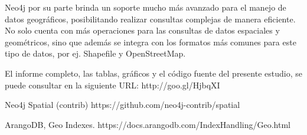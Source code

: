 \documentclass{llncs}
\begin{document}
Neo4j por su parte brinda un soporte mucho más avanzado para el manejo de datos geográficos, posibilitando realizar consultas complejas de manera eficiente. No solo cuenta con más operaciones para las consultas de datos espaciales y geométricos, sino que además se integra con los formatos más comunes para este tipo de datos, por ej. Shapefile y OpenStreetMap.

El informe completo, las tablas, gráficos y el código fuente del presente estudio, se puede consultar en la siguiente URL: http://goo.gl/HjbqXI

%
%
\vspace{-1em}
\begin{thebibliography}{5}
%
Neo4j Spatial (contrib)
https://github.com/neo4j-contrib/spatial

ArangoDB, Geo Indexes.
https://docs.arangodb.com/IndexHandling/Geo.html

\end{thebibliography}
\end{document}
